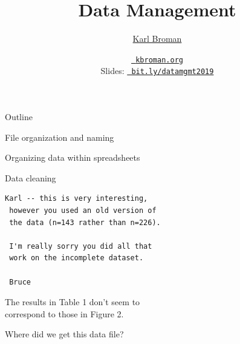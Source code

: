 \documentclass[aspectratio=169,12pt,t]{beamer}
\title{Data Management}
\author{\href{https://kbroman.org}{Karl Broman}}
\institute{Biostatistics \& Medical Informatics \\ Univ.\ Wisconsin{\textendash}Madison}
\date{\href{https://kbroman.org}{\tt \scriptsize \color{foreground} kbroman.org}
\\[2pt]
\scriptsize {\lolit Slides:} \href{https://bit.ly/datamgmt2019}{\tt \scriptsize
  \color{foreground} bit.ly/datamgmt2019}
}
\begin{document}
{
 }


\begin{frame}[c]{Outline}

  \bbi
\item File organization and naming
\item Organizing data within spreadsheets
\item Data cleaning
  \ei

\end{frame}



\begin{frame}[fragile,c]{}

\begin{center}
\begin{minipage}[c]{9.3cm}
\begin{semiverbatim}
\lstset{basicstyle=\normalsize}
\begin{lstlisting}[linewidth=9.3cm]
 Karl -- this is very interesting,
 however you used an old version of
 the data (n=143 rather than n=226).

 I'm really sorry you did all that
 work on the incomplete dataset.

 Bruce
\end{lstlisting}
\end{semiverbatim}
\end{minipage}
\end{center}

\end{frame}


\begin{frame}[c]{}
\centering
{\Large The results in Table 1 don't seem to \\[12pt]
correspond to those in Figure 2.}

\end{frame}



\begin{frame}[c]{}
\centerline{\Large Where did we get this data file?}
\end{frame}
\end{document}
